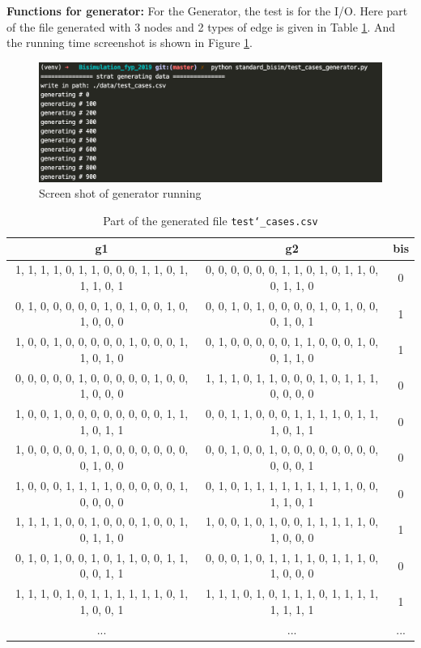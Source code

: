\noindent\textbf{Functions for generator:}
\noindent For the Generator, the test is for the I/O.
Here part of the file generated with 3 nodes and 2 types of edge is given in Table \ref{tab:partoffile}. 
And the running time screenshot is shown in Figure \ref{fig:runscreengen}.

\begin{figure}[h]
\centering
\includegraphics[width=\textwidth]{img/runscreengen.png}
\caption{Screen shot of generator running}
\label{fig:runscreengen}
\end{figure}

\begin{table}[h]
\small
\centering
\begin{tabular}{ |c|c|c| } 
 \hline
    g1 & g2 & bis \\
 \hline
    1, 1, 1, 1, 0, 1, 1, 0, 0, 0, 1, 1, 0, 1, 1, 1, 0, 1  &  0, 0, 0, 0, 0, 0, 1, 1, 0, 1, 0, 1, 1, 0, 0, 1, 1, 0  &  0 \\
    0, 1, 0, 0, 0, 0, 0, 1, 0, 1, 0, 0, 1, 0, 1, 0, 0, 0  &  0, 0, 1, 0, 1, 0, 0, 0, 0, 1, 0, 1, 0, 0, 0, 1, 0, 1  &  1 \\
    1, 0, 0, 1, 0, 0, 0, 0, 0, 1, 0, 0, 0, 1, 1, 0, 1, 0  &  0, 1, 0, 0, 0, 0, 0, 1, 1, 0, 0, 0, 1, 0, 0, 1, 1, 0  &  1 \\
    0, 0, 0, 0, 0, 1, 0, 0, 0, 0, 0, 1, 0, 0, 1, 0, 0, 0  &  1, 1, 1, 0, 1, 1, 0, 0, 0, 1, 0, 1, 1, 1, 0, 0, 0, 0  &  0 \\
    1, 0, 0, 1, 0, 0, 0, 0, 0, 0, 0, 0, 1, 1, 1, 0, 1, 1  &  0, 0, 1, 1, 0, 0, 0, 1, 1, 1, 1, 0, 1, 1, 1, 0, 1, 1  &  0 \\
    1, 0, 0, 0, 0, 0, 1, 0, 0, 0, 0, 0, 0, 0, 0, 1, 0, 0  &  0, 0, 1, 0, 0, 1, 0, 0, 0, 0, 0, 0, 0, 0, 0, 0, 0, 1  &  0 \\
    1, 0, 0, 0, 1, 1, 1, 1, 0, 0, 0, 0, 0, 1, 0, 0, 0, 0  &  0, 1, 0, 1, 1, 1, 1, 1, 1, 1, 1, 1, 0, 0, 1, 1, 0, 1  &  0 \\
    1, 1, 1, 1, 0, 0, 1, 0, 0, 0, 1, 0, 0, 1, 0, 1, 1, 0  &  1, 0, 0, 1, 0, 1, 0, 0, 1, 1, 1, 1, 1, 0, 1, 0, 0, 0  &  1 \\
    0, 1, 0, 1, 0, 0, 1, 0, 1, 1, 0, 0, 1, 1, 0, 0, 1, 1  &  0, 0, 0, 1, 0, 1, 1, 1, 1, 0, 1, 1, 1, 0, 1, 0, 0, 0  &  0 \\
    1, 1, 1, 0, 1, 0, 1, 1, 1, 1, 1, 1, 0, 1, 1, 0, 0, 1  &  1, 1, 1, 0, 1, 0, 1, 1, 1, 0, 1, 1, 1, 1, 1, 1, 1, 1  &  1 \\
    ...  & ...  & ... \\
 \hline
\end{tabular}
\caption{Part of the generated file \texttt{test\char`_cases.csv}}
\label{tab:partoffile}
\end{table}



